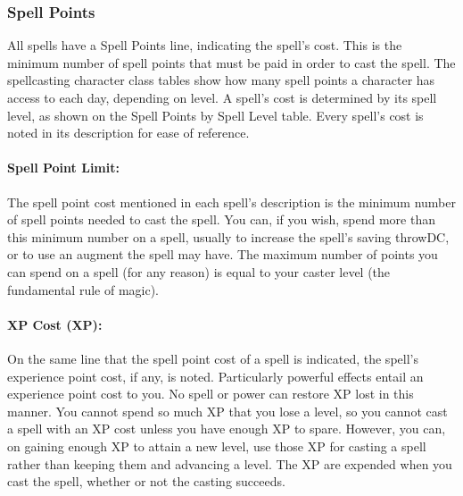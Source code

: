 \subsubsection{Spell Points}
All spells have a Spell Points line, indicating the spell's cost. This is the minimum number of spell points that must be paid in order to cast the spell.
The spellcasting character class tables show how many spell points a character has access to each day, depending on level.
A spell's cost is determined by its spell level, as shown on the Spell Points by Spell Level table. %
Every spell's cost is noted in its description for ease of reference.
\begin{center}
\end{center}

\paragraph{Spell Point Limit:} 
The spell point cost mentioned in each spell's description is the minimum number of spell points needed to cast the spell. 
You can, if you wish, spend more than this minimum number on a spell, usually to increase the spell's saving throwDC, or to use an augment the spell may have.
The maximum number of points you can spend on a spell (for any reason) is equal to your caster level (the fundamental rule of magic).

\paragraph{XP Cost (XP):} On the same line that the spell point cost of a spell is indicated, the spell's experience point cost, if any, is noted. Particularly powerful effects entail an experience point cost to you. No spell or power can restore XP lost in this manner. You cannot spend so much XP that you lose a level, so you cannot cast a spell with an XP cost unless you have enough XP to spare. However, you can, on gaining enough XP to attain a new level, use those XP for casting a spell rather than keeping them and advancing a level. The XP are expended when you cast the spell, whether or not the casting succeeds.

